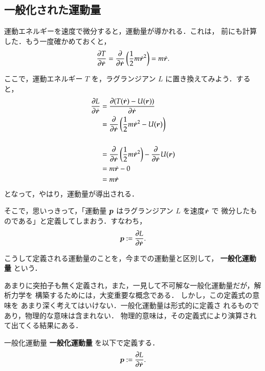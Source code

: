         \subsection{一般化された運動量}
            運動エネルギーを速度で微分すると，運動量が導かれる．これは，
            前にも計算した．もう一度確かめておくと，
                \begin{equation*}
                    \frac{\partial T}{\partial \dot{\boldsymbol{r}}} = \frac{\partial}{\partial \dot{\boldsymbol{r}}}
                                                    \left(
                                                        \frac{1}{2} m {\dot{\boldsymbol{r}}}^{2}
                                                    \right)
                                                = m {\dot{\boldsymbol{r}}}.
                \end{equation*}

            ここで，運動エネルギー $T$ を，ラグランジアン $L$ に置き換えてみよう．すると，
                \begin{align*}
                    \frac{\partial L}{\partial \dot{\boldsymbol{r}}} &=  \frac{\partial (T(\dot{\boldsymbol{r}})-U(\boldsymbol{r}))}{\partial \dot{\boldsymbol{r}}} \\
                                                &=  \frac{\partial}{\partial \dot{\boldsymbol{r}}}
                                                    \left( \frac{1}{2} m {\dot{\boldsymbol{r}}}^{2} - U(\boldsymbol{r}) \right) \\  \\
                                                &= \frac{\partial}{\partial \dot{\boldsymbol{r}}} \left( \frac{1}{2} m {\dot{\boldsymbol{r}}}^{2}\right) - \frac{\partial}{\partial \dot{\boldsymbol{r}}} U(\boldsymbol{r}) \\
                                                &= m {\dot{\boldsymbol{r}}} - 0 \\
                                                &= m {\dot{\boldsymbol{r}}}
                \end{align*}
            となって，やはり，運動量が導出される．

            そこで，思いっきって，「運動量 $\boldsymbol{p}$ はラグランジアン $L$ を速度$\dot{\boldsymbol{r}}$ で
            微分したものである」と定義してしまおう．すなわち，
                \begin{equation*}
                    \boldsymbol{p} := \frac{\partial L}{\partial \dot{\boldsymbol{r}}}.
                \end{equation*}

            こうして定義される運動量のことを，今までの運動量と区別して，
            \textbf{一般化運動量} という．

            あまりに突拍子も無く定義され，また，一見して不可解な一般化運動量だが，解析力学を
            構築するためには，大変重要な概念である．
            しかし，この定義式の意味を
            あまり深く考えてはいけない．一般化運動量は形式的に定義さ
            れるものであり，物理的な意味は含まれない．
            物理的意味は，その定義式により演算されて出てくる結果にある．
                \begin{myshadebox}{一般化運動量}
                    \textbf{一般化運動量} を以下で定義する．
                    \begin{align}
                        \boldsymbol{p} := \frac{\partial L}{\partial \dot{\boldsymbol{r}}}.
                    \end{align}
                \end{myshadebox}

